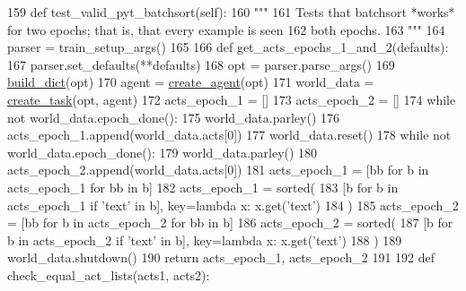 \begin{DoxyCode}
159     \textcolor{keyword}{def }test\_valid\_pyt\_batchsort(self):
160         \textcolor{stringliteral}{"""}
161 \textcolor{stringliteral}{        Tests that batchsort *works* for two epochs; that is, that every example is seen}
162 \textcolor{stringliteral}{        both epochs.}
163 \textcolor{stringliteral}{        """}
164         parser = train\_setup\_args()
165 
166         \textcolor{keyword}{def }get\_acts\_epochs\_1\_and\_2(defaults):
167             parser.set\_defaults(**defaults)
168             opt = parser.parse\_args()
169             \hyperlink{namespacebuild__dict}{build\_dict}(opt)
170             agent = \hyperlink{namespaceparlai_1_1core_1_1agents_ad0d54074d4bcc148bb415ab5515a53b5}{create\_agent}(opt)
171             world\_data = \hyperlink{namespaceparlai_1_1core_1_1worlds_a11923c10b545c7ecc1b08fe2242d9c2c}{create\_task}(opt, agent)
172             acts\_epoch\_1 = []
173             acts\_epoch\_2 = []
174             \textcolor{keywordflow}{while} \textcolor{keywordflow}{not} world\_data.epoch\_done():
175                 world\_data.parley()
176                 acts\_epoch\_1.append(world\_data.acts[0])
177             world\_data.reset()
178             \textcolor{keywordflow}{while} \textcolor{keywordflow}{not} world\_data.epoch\_done():
179                 world\_data.parley()
180                 acts\_epoch\_2.append(world\_data.acts[0])
181             acts\_epoch\_1 = [bb \textcolor{keywordflow}{for} b \textcolor{keywordflow}{in} acts\_epoch\_1 \textcolor{keywordflow}{for} bb \textcolor{keywordflow}{in} b]
182             acts\_epoch\_1 = sorted(
183                 [b \textcolor{keywordflow}{for} b \textcolor{keywordflow}{in} acts\_epoch\_1 \textcolor{keywordflow}{if} \textcolor{stringliteral}{'text'} \textcolor{keywordflow}{in} b], key=\textcolor{keyword}{lambda} x: x.get(\textcolor{stringliteral}{'text'})
184             )
185             acts\_epoch\_2 = [bb \textcolor{keywordflow}{for} b \textcolor{keywordflow}{in} acts\_epoch\_2 \textcolor{keywordflow}{for} bb \textcolor{keywordflow}{in} b]
186             acts\_epoch\_2 = sorted(
187                 [b \textcolor{keywordflow}{for} b \textcolor{keywordflow}{in} acts\_epoch\_2 \textcolor{keywordflow}{if} \textcolor{stringliteral}{'text'} \textcolor{keywordflow}{in} b], key=\textcolor{keyword}{lambda} x: x.get(\textcolor{stringliteral}{'text'})
188             )
189             world\_data.shutdown()
190             \textcolor{keywordflow}{return} acts\_epoch\_1, acts\_epoch\_2
191 
192         \textcolor{keyword}{def }check\_equal\_act\_lists(acts1, acts2):

\end{DoxyCode}
